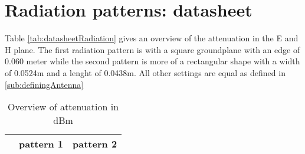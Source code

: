 \chapter{Radiation patterns: datasheet}
\label{ch:radpattern}
Table \ref{tab:datasheetRadiation} gives an overview of the attenuation in the E and H plane. The first radiation pattern 
is with a square groundplane with an edge of 0.060 meter while the second pattern is more of a rectangular shape with a width of 0.0524m and a lenght of 0.0438m.
All other settings are equal as defined in \ref{sub:definingAntenna}
\begin{table*}[!ht]
\centering
\caption{Overview of attenuation in dBm}
\begin{tabular}{|l|l|l|l|l|}
\hline
 & \multicolumn{2}{c|}{pattern 1} & \multicolumn{2}{|c|}{pattern 2}\\\hline


\end{tabular}
\end{table*}
